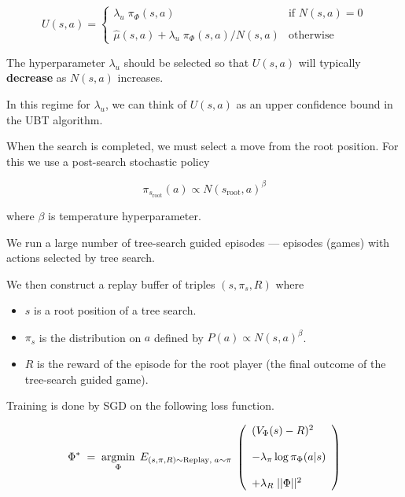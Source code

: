 {
$$U(s,a) =  \left\{\begin{array}{ll}\lambda_u \; \pi_\Phi(s,a) &\mbox{if $N(s,a) = 0$} \\ \\ \hat{\mu}(s,a) + \lambda_u\; \pi_\Phi(s,a)/N(s,a) & \mbox{otherwise} \end{array}\right.$$

\vfill
The hyperparameter $\lambda_u$ should be selected so that $U(s,a)$ will typically {\bf decrease} as $N(s,a)$ increases.

\vfill
In this regime for $\lambda_u$, we can think of $U(s,a)$ as an upper confidence bound in the UBT algorithm.


When the search is completed, we must select a move from the root position.  For this we use a post-search stochastic policy

\vfill
$$\pi_{s_{\mathrm{root}}}(a) \propto N(s_{\mathrm{root}},a)^\beta$$

\vfill
where $\beta$ is temperature hyperparameter.


We run a large number of tree-search guided episodes  --- episodes (games) with actions selected by tree search.

\vfill
We then construct a replay buffer of triples $(s,\pi_{s},R)$ where

\vfill
\begin{itemize}
\item $s$ is a root position of a tree search.

\vfill
\item $\pi_{s}$ is the distribution on $a$ defined by $P(a) \propto N(s,a)^\beta$.

\vfill
\item $R$ is the reward of the episode for the root player (the final outcome of the tree-search guided game).
\end{itemize}


\vfill
Training is done by SGD on the following loss function.

$$\Phi^*\; = \;\operatorname*{argmin}_\Phi \;E_{(s,\pi,R) \sim \mathrm{Replay},\;a \sim \pi}\;\left(\begin{array}{l} (V_\Phi(s) - R)^2 \\ \\ - \lambda_\pi\log \pi_\Phi(a|s) \\ \\ + \lambda_R\;||\Phi||^2\end{array}\right)$$

}
